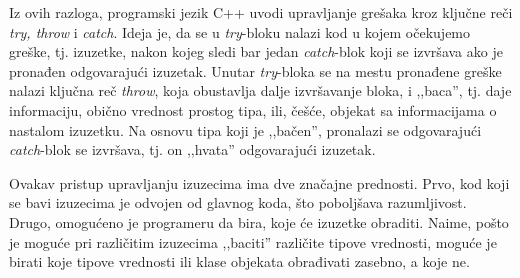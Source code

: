 \documentclass[a4paper]{article}
\begin{document}
Iz ovih razloga, programski jezik C++ uvodi upravljanje grešaka kroz ključne reči \emph{try, throw} i \emph{catch}. Ideja je, da se u \emph{try}-bloku nalazi kod u kojem očekujemo greške, tj. izuzetke, nakon kojeg sledi bar jedan \emph{catch}-blok koji se izvršava ako je pronađen odgovarajući izuzetak. Unutar \emph{try}-bloka se na mestu pronađene greške nalazi ključna reč \emph{throw}, koja obustavlja dalje izvršavanje bloka, i ,,baca'', tj. daje informaciju, obično vrednost prostog tipa, ili, češće, objekat sa informacijama o nastalom izuzetku. Na osnovu tipa koji je ,,bačen'', pronalazi se odgovarajući \emph{catch}-blok se izvršava, tj. on ,,hvata'' odgovarajući izuzetak.

Ovakav pristup upravljanju izuzecima ima dve značajne prednosti. Prvo, kod koji se bavi izuzecima je odvojen od glavnog koda, što poboljšava razumljivost. Drugo, omogućeno je programeru da bira, koje će izuzetke obraditi. Naime, pošto je moguće pri različitim izuzecima ,,baciti'' različite tipove vrednosti, moguće je birati koje tipove vrednosti ili klase objekata obrađivati zasebno, a koje ne.

\end{document}
